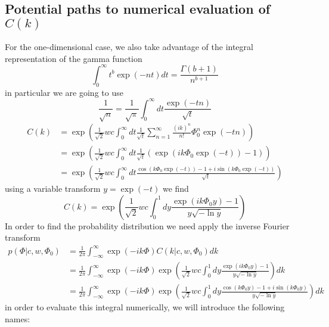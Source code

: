 \documentclass[%
 reprint,
 amsmath,amssymb,
 aps,
]{revtex4-1}
\begin{document}
\subsection{Potential paths to numerical evaluation of $C(k)$}
For the one-dimensional case, we also take advantage of the integral representation of the gamma function
\begin{equation}
	\int_{0}^{\infty}t^{b}\exp(-nt)dt = \frac{\Gamma (b+1)}{n^{b+1}}
\end{equation}
in particular we are going to use
\begin{equation}
	\frac{1}{\sqrt{n}}=\frac{1}{\sqrt{\pi}}\int_{0}^{\infty}dt\frac{\exp(-tn)}{\sqrt{t}}
\end{equation}
\begin{equation}
	\begin{aligned}
	C(k) &= \exp\left(\frac{1}{\sqrt{2}}wc\int_{0}^{\infty}dt\frac{1}{\sqrt{t}}\sum_{n=1}^{\infty}\frac{(ik)^{n}}{n!}\Phi_{0}^{n}\exp(-tn) \right)\\
	&= \exp\left(\frac{1}{\sqrt{2}}wc\int_{0}^{\infty}dt\frac{1}{\sqrt{t}}(\exp(ik\Phi_{0}\exp(-t))-1) \right)\\
	&= \exp\left(\frac{1}{\sqrt{2}}wc\int_{0}^{\infty}dt\frac{\cos(k\Phi_{0}\exp(-t))-1+i\sin(k\Phi_{0}\exp(-t))}{\sqrt{t}} \right)
	\end{aligned}
\end{equation}
using a variable transform $y=\exp(-t)$ we find
\begin{equation}
	C(k) = \exp\left(\frac{1}{\sqrt{2}}wc\int_{0}^{1}dy\frac{\exp(ik\Phi_{0}y)-1}{y\sqrt{-\ln y}}\right)
\end{equation}
In order to find the probability distribution we need apply the inverse Fourier transform
\begin{equation}
	\begin{aligned}
	p(\Phi\left|c,w,\Phi_{0}\right.) &= \frac{1}{2\pi}\int_{-\infty}^{\infty} \exp(-ik\Phi)C(k\left|c,w,\Phi_{0}\right.)dk\\
	&=\frac{1}{2\pi}\int_{-\infty}^{\infty} \exp(-ik\Phi)\exp\left(\frac{1}{\sqrt{2}}wc\int_{0}^{1}dy\frac{\exp(ik\Phi_{0}y)-1}{y\sqrt{-\ln y}}\right)dk\\
	&=\frac{1}{2\pi}\int_{-\infty}^{\infty} \exp(-ik\Phi)\exp\left(\frac{1}{\sqrt{2}}wc\int_{0}^{1}dy\frac{\cos(k\Phi_{0}y)-1+i\sin(k\Phi_{0}y)}{y\sqrt{-\ln y}}\right)dk
	\end{aligned}
\end{equation}
in order to evaluate this integral numerically, we will introduce the following names:
\end{document}
